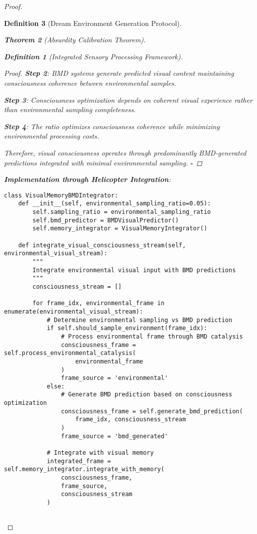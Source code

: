 \documentclass[12pt,a4paper]{article}
\newtheorem{theorem}{Theorem}[section]
\newtheorem{definition}[theorem]{Definition}
\begin{document}
\begin{proof}
\begin{definition}[Dream Environment Generation Protocol]
\begin{theorem}[Absurdity Calibration Theorem]
\begin{observation}
\begin{definition}[Integrated Sensory Processing Framework]
\begin{proof}
\textbf{Step 2}: BMD systems generate predicted visual content maintaining consciousness coherence between environmental samples.

\textbf{Step 3}: Consciousness optimization depends on coherent visual experience rather than environmental sampling completeness.

\textbf{Step 4}: The  ratio optimizes consciousness coherence while minimizing environmental processing costs.

Therefore, visual consciousness operates through predominantly BMD-generated predictions integrated with minimal environmental sampling. $\square$
\end{proof}

\textbf{Implementation through Helicopter Integration}:

\begin{lstlisting}[style=pythonstyle, caption=Visual Memory BMD Integration]
class VisualMemoryBMDIntegrator:
    def __init__(self, environmental_sampling_ratio=0.05):
        self.sampling_ratio = environmental_sampling_ratio
        self.bmd_predictor = BMDVisualPredictor()
        self.memory_integrator = VisualMemoryIntegrator()
        
    def integrate_visual_consciousness_stream(self, environmental_visual_stream):
        """
        Integrate environmental visual input with BMD predictions
        """
        consciousness_stream = []
        
        for frame_idx, environmental_frame in enumerate(environmental_visual_stream):
            # Determine environmental sampling vs BMD prediction
            if self.should_sample_environment(frame_idx):
                # Process environmental frame through BMD catalysis
                consciousness_frame = self.process_environmental_catalysis(
                    environmental_frame
                )
                frame_source = 'environmental'
            else:
                # Generate BMD prediction based on consciousness optimization
                consciousness_frame = self.generate_bmd_prediction(
                    frame_idx, consciousness_stream
                )
                frame_source = 'bmd_generated'
            
            # Integrate with visual memory
            integrated_frame = self.memory_integrator.integrate_with_memory(
                consciousness_frame,
                frame_source,
                consciousness_stream
            )
            

\end{lstlisting}
\end{definition}
\end{observation}
\end{theorem}
\end{definition}
\end{proof}
\end{document}
